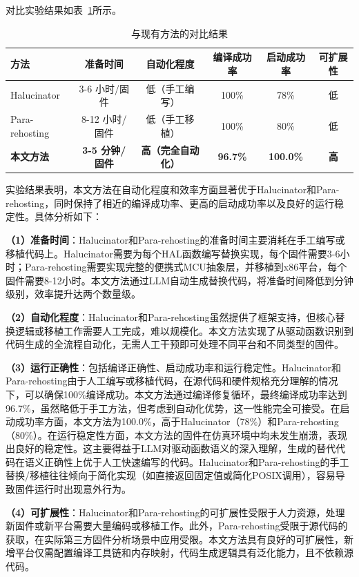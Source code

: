 对比实验结果如表~\ref{tab:compare_results}所示。

\begin{table}[htbp]
\centering
\caption{与现有方法的对比结果}
\label{tab:compare_results}
\small
\begin{tabular}{lccccc}
\toprule
\textbf{方法} & \textbf{准备时间} & \textbf{自动化程度} & \textbf{编译成功率} & \textbf{启动成功率} & \textbf{可扩展性} \\
\midrule
Halucinator & 3-6 小时/固件 & 低（手工编写） & 100\% & 78\% & 低 \\
Para-rehosting & 8-12 小时/固件 & 低（手工移植） & 100\% & 80\% & 低 \\
\textbf{本文方法} & \textbf{3-5 分钟/固件} & \textbf{高（完全自动化）} & \textbf{96.7\%} & \textbf{100.0\%} & \textbf{高} \\
\bottomrule
\end{tabular}
\end{table}

实验结果表明，本文方法在自动化程度和效率方面显著优于Halucinator和Para-rehosting，同时保持了相近的编译成功率、更高的启动成功率以及良好的运行稳定性。具体分析如下：

\textbf{（1）准备时间}：Halucinator和Para-rehosting的准备时间主要消耗在手工编写或移植代码上。Halucinator需要为每个HAL函数编写替换实现，每个固件需要3-6小时；Para-rehosting需要实现完整的便携式MCU抽象层，并移植到x86平台，每个固件需要8-12小时。本文方法通过LLM自动生成替换代码，将准备时间降低到分钟级别，效率提升达两个数量级。

\textbf{（2）自动化程度}：Halucinator和Para-rehosting虽然提供了框架支持，但核心替换逻辑或移植工作需要人工完成，难以规模化。本文方法实现了从驱动函数识别到代码生成的全流程自动化，无需人工干预即可处理不同平台和不同类型的固件。

\textbf{（3）运行正确性}：包括编译正确性、启动成功率和运行稳定性。Halucinator和Para-rehosting由于人工编写或移植代码，在源代码和硬件规格充分理解的情况下，可以确保100\%编译成功。本文方法通过编译修复循环，最终编译成功率达到96.7\%，虽然略低于手工方法，但考虑到自动化优势，这一性能完全可接受。在启动成功率方面，本文方法为100.0\%，高于Halucinator（78\%）和Para-rehosting（80\%）。在运行稳定性方面，本文方法的固件在仿真环境中均未发生崩溃，表现出良好的稳定性。这主要得益于LLM对驱动函数语义的深入理解，生成的替代代码在语义正确性上优于人工快速编写的代码。Halucinator和Para-rehosting的手工替换/移植往往倾向于简化实现（如直接返回固定值或简化POSIX调用），容易导致固件运行时出现意外行为。

\textbf{（4）可扩展性}：Halucinator和Para-rehosting的可扩展性受限于人力资源，处理新固件或新平台需要大量编码或移植工作。此外，Para-rehosting受限于源代码的获取，在实际第三方固件分析场景中应用受限。本文方法具有良好的可扩展性，新增平台仅需配置编译工具链和内存映射，代码生成逻辑具有泛化能力，且不依赖源代码。

